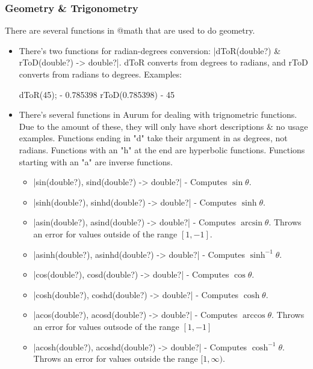 \documentclass[12pt, letterpaper, oneside]{article}
\begin{document}
	\subsubsection{Geometry \& Trigonometry}
	There are several functions in @math that are used to do geometry.
		\begin{itemize}
			\item[--] There's two functions for radian-degrees conversion: \spverb|dToR(double?) & rToD(double?) -> double?|. dToR converts from degrees to radians, and rToD converts from radians to degrees. Examples:
				
				
				\begin{spverbatim}
					dToR(45); - 0.785398
					rToD(0.785398) - 45
				\end{spverbatim}
			\newline
			\item[--] There's several functions in Aurum for dealing with trignometric functions. Due to the amount of these, they will only have short descriptions \& no usage examples. Functions ending in "d" take their argument in as degrees, not radians. Functions with an "h" at the end are \newline hyperbolic functions. Functions starting with an "a" are inverse \newline functions.
			\begin{itemize}
				\item[--] \spverb|sin(double?), sind(double?) -> double?| - Computes $\sin\theta$.
				\item[--] \spverb|sinh(double?), sinhd(double?) -> double?| - Computes $\sinh\theta$.
				\item[--] \spverb|asin(double?), asind(double?) -> double?| - Computes $\arcsin\theta$. Throws an error for values outside of the range $[1,-1]$.
				\item[--] \spverb|asinh(double?), asinhd(double?) -> double?| - Computes $\sinh^{-1}\theta$.
				\newline
				\item[--] \spverb|cos(double?), cosd(double?) -> double?| - Computes $\cos\theta$.
				\item[--] \spverb|cosh(double?), coshd(double?) -> double?| - Computes $\cosh\theta$.
				\item[--] \spverb|acos(double?), acosd(double?) -> double?| - Computes $\arccos\theta$. Throws an error for values outsode of the range $[1,-1]$
				\item[--] \spverb|acosh(double?), acoshd(double?) -> double?| - Computes $\cosh^{-1}\theta$. Throws an error for values outside the range $[1, \infty)$.	

\end{itemize}
\end{itemize}
\end{document}
